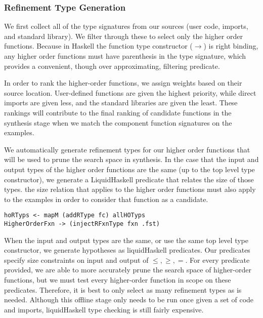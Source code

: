 \subsubsection{Refinement Type Generation}

We first collect all of the type signatures from our sources (user code, imports, and standard library). We filter through these to select only the higher order functions. Because in Haskell the function type constructor ($\to$) is right binding, any higher order functions must have parenthesis in the type signature, which provides a convenient, though over approximating, filtering predicate.

In order to rank the higher-order functions, we assign weights based on their source location. User-defined functions are given the highest priority, while direct imports are given less, and the standard libraries are given the least. These rankings will contribute to the final ranking of candidate functions in the synthesis stage when we match the component function signatures on the examples.

We automatically generate refinement types for our higher order functions that will be used to prune the search space in synthesis.
In the case that the input and output types of the higher order functions are the same (up to the top level type constructor), we generate a LiquidHaskell predicate that relates the size of those types.
the size relation that applies to the higher order functions must also apply to the examples in order to consider that function as a candidate.   

\begin{lstlisting}
hoRTyps <- mapM (addRType fc) allHOTyps
HigherOrderFxn -> (injectRFxnType fxn .fst)
\end{lstlisting}


When the input and output types are the same, or use the same top level type constructor, we generate hypotheses as liquidHaskell predicates.
Our predicates specify size constraints on input and output of $\leq,\geq,=$.
For every predicate provided, we are able to more accurately prune the search space of higher-order functions, but we must test every higher-order function in scope on these predicates. 
Therefore, it is best to only select as many refinement types as is needed.
Although this offline stage only needs to be run once given a set of code and imports, liquidHaskell type checking is still fairly expensive.

